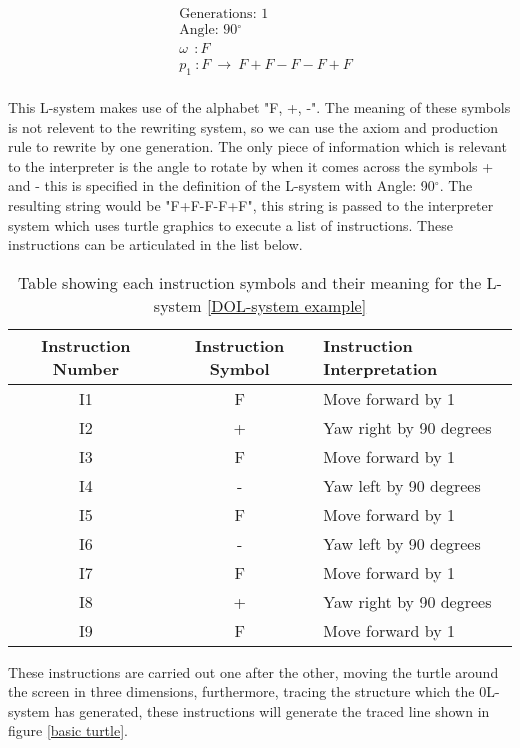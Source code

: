 \begin{equation} \label{DOL-system example}
\begin{aligned}
	&\text{Generations: 1}\\
	&\text{Angle: 90$^{\circ}$}\\
	&\omega~~ : F \\
	&p_1~ :  F~ \rightarrow~ F+F-F-F+F\\
\end{aligned}
\end{equation}

\noindent
This L-system makes use of the alphabet "F, +, -". The meaning of these symbols is not relevent to the rewriting system, so we can use the axiom and production rule to rewrite by one generation. The only piece of information which is relevant to the interpreter is the angle to rotate by when it comes across the symbols + and - this is specified in the definition of the L-system with Angle: 90$^{\circ}$. The resulting string would be "F+F-F-F+F", this string is passed to the interpreter system which uses turtle graphics to execute a list of instructions. These instructions can be articulated in the list below.

\begin{table}[h!]
\centering
\begin{tabular}{ | c | c | l | }
\hline
	 	Instruction Number & Instruction Symbol & Instruction Interpretation \\  
\hline
\hline
	I1 						& F & Move forward by 1\\
\hline
	I2						& + & Yaw right by 90 degrees\\
\hline
	I3						& F & Move forward by 1\\
\hline
	I4						& - & Yaw left by 90 degrees \\
\hline
	I5						& F & Move forward by 1\\
\hline
	I6 						& - & Yaw left by 90 degrees \\
\hline
	I7 						& F & Move forward by 1\\
\hline
	I8 						& + & Yaw right by 90 degrees\\
\hline
	I9 						& F & Move forward by 1\\
\hline
\end{tabular}
\caption{Table showing each instruction symbols and their meaning for the L-system \ref{DOL-system example}}
\label{Instruction Interpretation}
\end{table}
\FloatBarrier

\noindent
These instructions are carried out one after the other, moving the turtle around the screen in three dimensions, furthermore, tracing the structure which the 0L-system has generated, these instructions will generate the traced line shown in figure \ref{basic turtle}.

